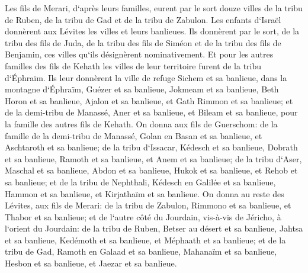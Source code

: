 \verse Les fils de Merari, d`après leurs familles, eurent par le sort douze villes de la tribu de Ruben, de la tribu de Gad et de la tribu de Zabulon. 
\verse Les enfants d`Israël donnèrent aux Lévites les villes et leurs banlieues. 
\verse Ils donnèrent par le sort, de la tribu des fils de Juda, de la tribu des fils de Siméon et de la tribu des fils de Benjamin, ces villes qu`ils désignèrent nominativement. 
\verse Et pour les autres familles des fils de Kehath les villes de leur territoire furent de la tribu d`Éphraïm. 
\verse Ils leur donnèrent la ville de refuge Sichem et sa banlieue, dans la montagne d`Éphraïm, Guézer et sa banlieue, 
\verse Jokmeam et sa banlieue, Beth Horon et sa banlieue, 
\verse Ajalon et sa banlieue, et Gath Rimmon et sa banlieue; 
\verse et de la demi-tribu de Manassé, Aner et sa banlieue, et Bileam et sa banlieue, pour la famille des autres fils de Kehath. 
\verse On donna aux fils de Guerschom: de la famille de la demi-tribu de Manassé, Golan en Basan et sa banlieue, et Aschtaroth et sa banlieue; 
\verse de la tribu d`Issacar, Kédesch et sa banlieue, Dobrath et sa banlieue, 
\verse Ramoth et sa banlieue, et Anem et sa banlieue; 
\verse de la tribu d`Aser, Maschal et sa banlieue, Abdon et sa banlieue, 
\verse Hukok et sa banlieue, et Rehob et sa banlieue; 
\verse et de la tribu de Nephthali, Kédesch en Galilée et sa banlieue, Hammon et sa banlieue, et Kirjathaïm et sa banlieue. 
\verse On donna au reste des Lévites, aux fils de Merari: de la tribu de Zabulon, Rimmono et sa banlieue, et Thabor et sa banlieue; 
\verse et de l`autre côté du Jourdain, vis-à-vis de Jéricho, à l`orient du Jourdain: de la tribu de Ruben, Betser au désert et sa banlieue, Jahtsa et sa banlieue, 
\verse Kedémoth et sa banlieue, et Méphaath et sa banlieue; 
\verse et de la tribu de Gad, Ramoth en Galaad et sa banlieue, Mahanaïm et sa banlieue, 
\verse Hesbon et sa banlieue, et Jaezar et sa banlieue. 

